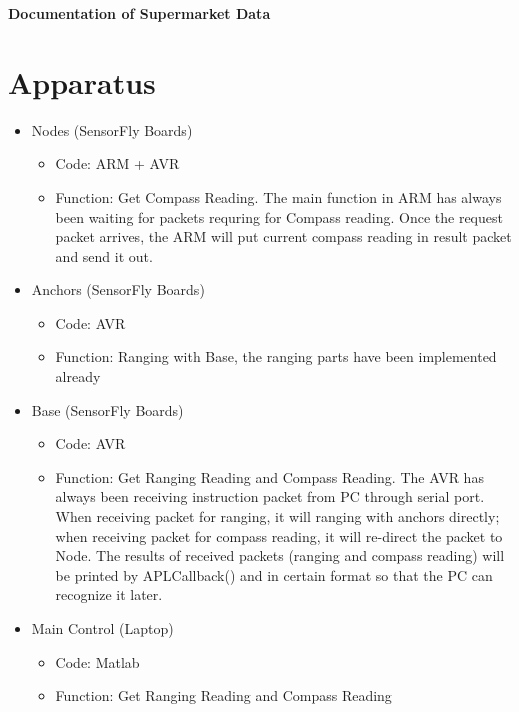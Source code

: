 \documentclass{article}
\begin{document}
\begin{center}
\LARGE \bf{Documentation of Supermarket Data}\\
\end{center}

\section{Apparatus}
\begin{itemize}
\item Nodes (SensorFly Boards)
	\begin{itemize}
	\item Code: ARM + AVR
	\item Function: Get Compass Reading. The main function in ARM has always been waiting for packets requring for Compass reading. Once the request packet arrives, the ARM will put current compass reading in result packet and send it out.
	\end{itemize}
\item Anchors (SensorFly Boards)
	\begin{itemize}
	\item Code: AVR
	\item Function: Ranging with Base, the ranging parts have been implemented already
	\end{itemize}
\item Base (SensorFly Boards)
	\begin{itemize}
	\item Code: AVR
	\item Function: Get Ranging Reading and Compass Reading. The AVR has always been receiving instruction packet from PC through serial port. When receiving packet for ranging, it will ranging with anchors directly; when receiving packet for compass reading, it will re-direct the packet to Node. The results of received packets (ranging and compass reading) will be printed by APLCallback() and in certain format so that the PC can recognize it later.
	\end{itemize}
\item Main Control (Laptop)
	\begin{itemize}
	\item Code: Matlab 
	\item Function: Get Ranging Reading and Compass Reading 
	\end{itemize}
\end{itemize}
\end{document}
